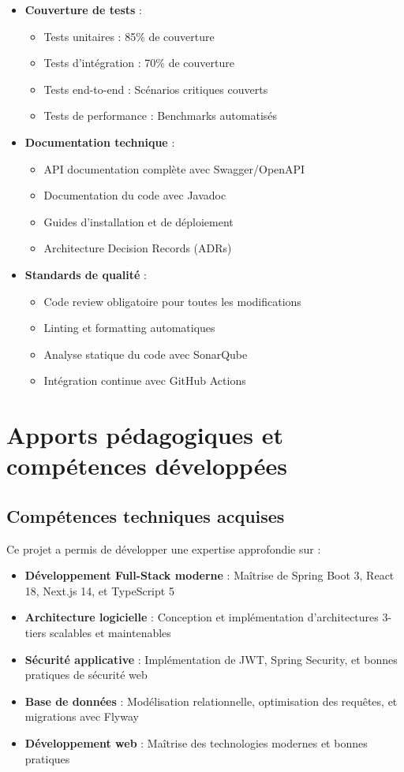 \documentclass[12pt,a4paper]{report}
\begin{document}
\begin{itemize}
\item \textbf{Couverture de tests} :
  \begin{itemize}
  \item Tests unitaires : 85\% de couverture
  \item Tests d'intégration : 70\% de couverture
  \item Tests end-to-end : Scénarios critiques couverts
  \item Tests de performance : Benchmarks automatisés
  \end{itemize}

\item \textbf{Documentation technique} :
  \begin{itemize}
  \item API documentation complète avec Swagger/OpenAPI
  \item Documentation du code avec Javadoc
  \item Guides d'installation et de déploiement
  \item Architecture Decision Records (ADRs)
  \end{itemize}

\item \textbf{Standards de qualité} :
  \begin{itemize}
  \item Code review obligatoire pour toutes les modifications
  \item Linting et formatting automatiques
  \item Analyse statique du code avec SonarQube
  \item Intégration continue avec GitHub Actions
  \end{itemize}
\end{itemize}

\section{Apports pédagogiques et compétences développées}

\subsection{Compétences techniques acquises}
Ce projet a permis de développer une expertise approfondie sur :

\begin{itemize}
\item \textbf{Développement Full-Stack moderne} : Maîtrise de Spring Boot 3, React 18, Next.js 14, et TypeScript 5
\item \textbf{Architecture logicielle} : Conception et implémentation d'architectures 3-tiers scalables et maintenables
\item \textbf{Sécurité applicative} : Implémentation de JWT, Spring Security, et bonnes pratiques de sécurité web
\item \textbf{Base de données} : Modélisation relationnelle, optimisation des requêtes, et migrations avec Flyway
\item \textbf{Développement web} : Maîtrise des technologies modernes et bonnes pratiques
\end{itemize}
\end{document}

